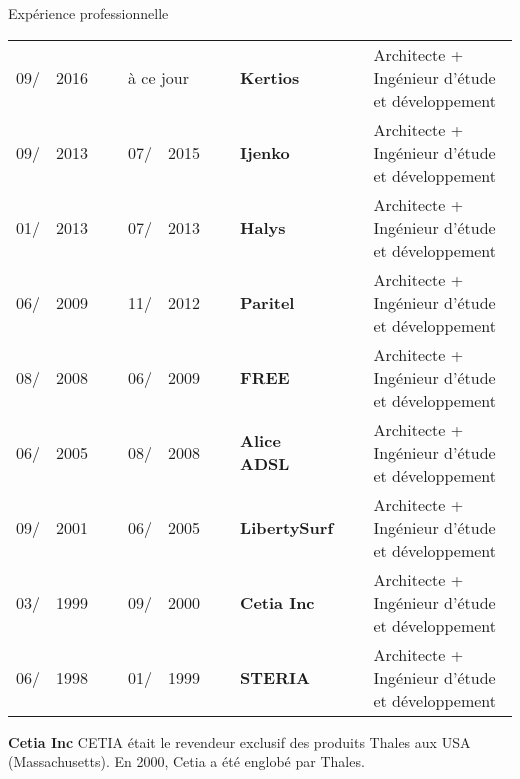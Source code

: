 \documentclass{cv}
\newlength{\interSectionTitleContentLength}
\newcommand{\mainSectionSeparator}[1]{
   \vspace{10pt}\par%
   \begin{tcolorbox}[notitle,
                     nobeforeafter, %
                     boxrule=0pt,
                     top=1pt,
                     bottom=1pt,
                     halign=center,
                     valign=center,
                     width=\textwidth,
                     colback={colorMainSection}]%
      #1%
   \end{tcolorbox}%
   \par%
}%
\newenvironment{sectionComponent}{
   \vspace{\interSectionTitleContentLength}\par%
}{%
   \par%
}%
\newenvironment{packed_tabular}{
   \setlength{\tabcolsep}{0pt}
}{}
\newcommand{\cpname}[1]{%
  \textbf{#1}%
}
\begin{document}

   \newpage
   \mainSectionSeparator{Expérience professionnelle}

   \begin{sectionComponent}
      \begin{packed_tabular}
         \begin{tabular}{lclclclll}
            09/ & 2016 & ~ & \multicolumn{2}{l}{à ce jour} & ~ & \cpname{Kertios}     & ~ &%
                Architecte + Ingénieur d'étude et développement \\
            09/ & 2013 & ~ & 07/ & 2015                    & ~ & \cpname{Ijenko}      & ~ &%
                Architecte + Ingénieur d'étude et développement \\
            01/ & 2013 & ~ & 07/ & 2013                    & ~ & \cpname{Halys}       & ~ &%
                Architecte + Ingénieur d'étude et développement \\
            06/ & 2009 & ~ & 11/ & 2012                    & ~ & \cpname{Paritel}     & ~ &%
                Architecte + Ingénieur d'étude et développement \\
            08/ & 2008 & ~ & 06/ & 2009                    & ~ & \cpname{FREE}        & ~ &%
                Architecte + Ingénieur d'étude et développement \\
            06/ & 2005 & ~ & 08/ & 2008                    & ~ & \cpname{Alice ADSL}  & ~ &%
                Architecte + Ingénieur d'étude et développement \\
            09/ & 2001 & ~ & 06/ & 2005                    & ~ & \cpname{LibertySurf} & ~ &%
                Architecte + Ingénieur d'étude et développement \\
            03/ & 1999 & ~ & 09/ & 2000                    & ~ & \cpname{Cetia Inc}   & ~ &%
                Architecte + Ingénieur d'étude et développement \\
            06/ & 1998 & ~ & 01/ & 1999                    & ~ & \cpname{STERIA}      & ~ &%
                Architecte + Ingénieur d'étude et développement \\
         \end{tabular}%
      \end{packed_tabular}%
      \par\vspace{10pt}\par
   
      \cpname{Cetia Inc} CETIA était le revendeur exclusif des produits Thales aux USA (Massachusetts). En 2000, Cetia a été englobé par Thales.
   \end{sectionComponent}
\end{document}
